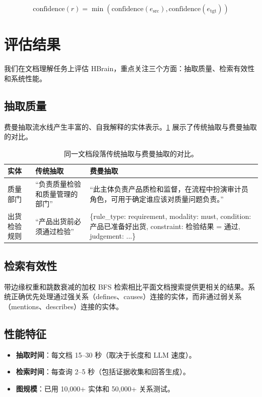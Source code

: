 \documentclass[11pt]{article}
\begin{document}
\begin{equation}
\text{confidence}(r) = \min(\text{confidence}(e_{\text{src}}), \text{confidence}(e_{\text{tgt}}))
\end{equation}

\section{评估结果}
\label{sec:results}

我们在文档理解任务上评估 HBrain，重点关注三个方面：抽取质量、检索有效性和系统性能。

\subsection{抽取质量}

费曼抽取流水线产生丰富的、自我解释的实体表示。\cref{tab:extraction-example} 展示了传统抽取与费曼抽取的对比。

\begin{table}[htbp]
\centering
\caption{同一文档段落传统抽取与费曼抽取的对比。}
\label{tab:extraction-example}
\begin{tabular}{@{}p{2.5cm}p{5.5cm}p{5.5cm}@{}}
\toprule
\textbf{实体} & \textbf{传统抽取} & \textbf{费曼抽取} \\
\midrule
质量部门 & “负责质量检验和质量管理的部门” & “此主体负责产品质检和监督，在流程中扮演审计员角色，可用于确定谁应该对质量问题负责。” \\
\midrule
出货检验规则 & “产品出货前必须通过检验” & \{rule\_type: requirement, modality: must, condition: 产品已准备好出货, constraint: 检验结果 = 通过, judgement: ...\} \\
\bottomrule
\end{tabular}
\end{table}

\subsection{检索有效性}

带边缘权重和跳数衰减的加权 BFS 检索相比平面文档搜索提供更相关的结果。系统正确优先处理通过强关系（defines、causes）连接的实体，而非通过弱关系（mentions、describes）连接的实体。

\subsection{性能特征}

\begin{itemize}
    \item \textbf{抽取时间}：每文档 15--30 秒（取决于长度和 LLM 速度）。
    \item \textbf{检索时间}：每查询 2--5 秒（包括证据收集和回答生成）。
    \item \textbf{图规模}：已用 10,000+ 实体和 50,000+ 关系测试。
\end{itemize}
\end{document}
